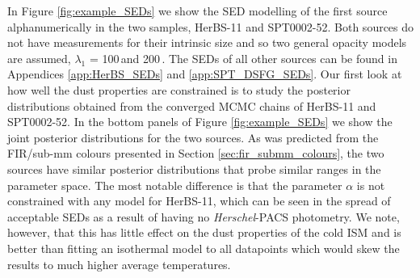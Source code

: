 In Figure \ref{fig:example_SEDs} we show the SED modelling of the first source alphanumerically in the two samples, HerBS-11 and SPT0002-52. Both sources do not have measurements for their intrinsic size and so two general opacity models are assumed, $\lambda_1$ = 100\,\micron and 200\,\micron. The SEDs of all other sources can be found in Appendices \ref{app:HerBS_SEDs} and \ref{app:SPT_DSFG_SEDs}. Our first look at how well the dust properties are constrained is to study the posterior distributions obtained from the converged MCMC chains of HerBS-11 and SPT0002-52. In the bottom panels of Figure \ref{fig:example_SEDs} we show the joint posterior distributions for the two sources. As was predicted from the FIR/sub-mm colours presented in Section \ref{sec:fir_submm_colours}, the two sources have similar posterior distributions that probe similar ranges in the parameter space. The most notable difference is that the parameter $\alpha$ is not constrained with any model for HerBS-11, which can be seen in the spread of acceptable SEDs as a result of having no \textit{Herschel}-PACS photometry. We note, however, that this has little effect on the dust properties of the cold ISM and is better than fitting an isothermal model to all datapoints which would skew the results to much higher average temperatures. 

